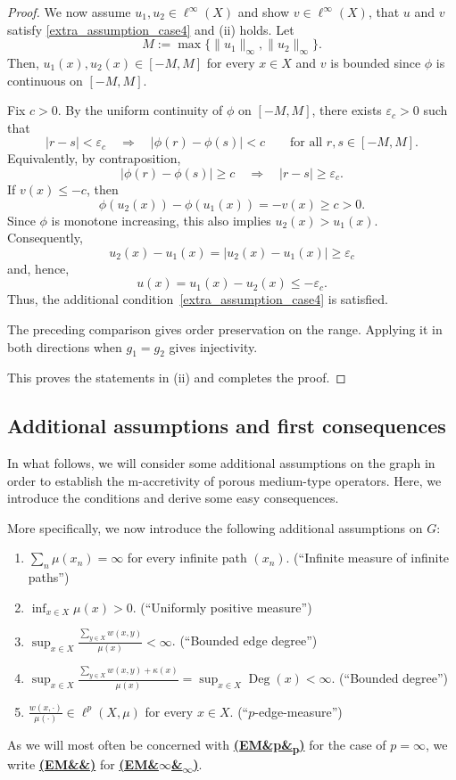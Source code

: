 \documentclass[letterpaper]{article}
\theoremstyle{definition}
\theoremstyle{named}
\numberwithin{equation}{section}
\newcommand{\IP}{\hyperlink{ass:IP}{\textup{\textbf{(IP)}}}}
\newcommand{\UM}{\hyperlink{ass:UM}{\textup{\textbf{(UM)}}}}
\newcommand{\B}{\hyperlink{ass:B}{\textup{\textbf{(B)}}}}
\newcommand{\BD}{\hyperlink{ass:BD}{\textup{\textbf{(BD)}}}}
\newcommand{\EMp}{\hyperlink{ass:EM}{\textup{\textbf{(EM\textsubscript{p})}}}}
\newcommand{\EM}[1][]{\hyperlink{ass:EM}{\textup{\textbf{(EM\ifx&#1&\else\textsubscript{#1}\fi)}}}}
\newcommand{\Deg}{\operatorname{Deg}}
\begin{document}
\begin{proof}
{{We now assume $u_1,u_2 \in \ell^\infty(X)$ and show $v \in \ell^\infty(X)$, 
that $u$ and $v$ satisfy \eqref{extra_assumption_case4} and (ii) holds.}
Let
\[
 M:=\max\{\|u_1\|_\infty,\|u_2\|_\infty\}.
\]
Then, $u_1(x),u_2(x)\in[-M,M]$ for every $x\in X$ and $v$ is
bounded since $\phi$ is continuous on $[-M,M]$.

Fix $c>0$. By the uniform continuity of $\phi$ on $[-M,M]$, there exists
$\varepsilon_c>0$ such that
\[
 |r-s|<\varepsilon_c
 \quad\Longrightarrow\quad
 |\phi(r)-\phi(s)|<c
 \qquad\text{for all }r,s\in[-M,M].
\]
Equivalently, by contraposition,
\[
 |\phi(r)-\phi(s)|\geq c
 \quad\Longrightarrow\quad
 |r-s|\geq\varepsilon_c.
\]
If $v(x)\leq-c$, then
\[
 \phi(u_2(x))-\phi(u_1(x))=-v(x)\geq c>0.
\]
Since $\phi$ is monotone increasing, this also implies $u_2(x)>u_1(x)$.
Consequently,
\[
 u_2(x)-u_1(x)
 =
 |u_2(x)-u_1(x)|
 \geq\varepsilon_c
\]
and, hence,
\[
 u(x)=u_1(x)-u_2(x)\leq-\varepsilon_c.
\]
Thus, the additional condition~\eqref{extra_assumption_case4} is
satisfied.

The preceding comparison gives order preservation on the range.
Applying it in both directions when $g_1=g_2$ gives injectivity.}
{ This proves the statements in (ii) and completes the proof.}

\end{proof}

\subsection{Additional assumptions and first consequences}
In what follows, we will consider some additional assumptions on the graph 
in order to establish the m-accretivity of porous medium-type operators. 
Here, we introduce the conditions and derive some easy consequences.

More specifically, we now introduce the following additional assumptions on $G$: 
\hypertarget{ass:LF}{}\hypertarget{ass:FP}{}\hypertarget{ass:INT}{}%
\begin{enumerate}
    \item[$\IP$]\hypertarget{ass:IP}{} $\sum_n\mu(x_n) = \infty$ for every infinite path $(x_n)$. \hfill(``Infinite measure of infinite paths'')
	\item[$\UM$]\hypertarget{ass:UM}{} $\inf_{x \in X}\mu(x)>0$. \hfill(``Uniformly positive measure'')
	\item[$\B$]\hypertarget{ass:B}{} $\sup_{x \in X}\frac{\sum_{y \in X}w(x,y)}{\mu(x)}<\infty$. \hfill(``Bounded edge degree'')
    \item[$\BD$]\hypertarget{ass:BD}{} $\sup_{x \in X}\frac{\sum_{y \in X}w(x,y)+\kappa(x)}{\mu(x)} = \sup_{x \in X}\Deg(x) <
    \infty$. \hfill(``Bounded degree'')
    \item[$\EMp$]\hypertarget{ass:EM}{} $\frac{w(x,\cdot)}{\mu(\cdot)}\in \ell^{p}(X,\mu)$ for every $x \in X$.  \hfill(``$p$-edge-measure'')
\end{enumerate}
As we will most often be concerned with \EM[p] for the case of $p=\infty$,
we write \EM[] for \EM[$\infty$].
\end{document}
